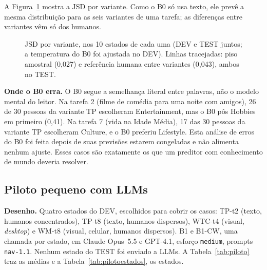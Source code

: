 \documentclass[12pt]{article}
\newcommand{\code}[1]{\texttt{#1}}
\begin{document}
A Figura~\ref{fig:variantes} mostra a JSD por variante. Como o B0 só usa texto, ele prevê a mesma distribuição para as seis variantes de uma tarefa; as diferenças entre variantes vêm só dos humanos.

\begin{figure}[ht]
\centering
{}
\caption{JSD por variante, nos 10 estados de cada uma (DEV e TEST juntos; a temperatura do B0 foi ajustada no DEV). Linhas tracejadas: piso amostral (0,027) e referência humana entre variantes (0,043), ambos no TEST.}
\label{fig:variantes}
\end{figure}

\textbf{Onde o B0 erra.} O B0 segue a semelhança literal entre palavras, não o modelo mental do leitor. Na tarefa 2 (filme de comédia para uma noite com amigos), 26 de 30 pessoas da variante TP escolheram Entertainment, mas o B0 pôs Hobbies em primeiro (0,41). Na tarefa 7 (vida na Idade Média), 17 das 30 pessoas da variante TP escolheram Culture, e o B0 preferiu Lifestyle. Esta análise de erros do B0 foi feita depois de suas previsões estarem congeladas e não alimenta nenhum ajuste. Esses casos são exatamente os que um preditor com conhecimento de mundo deveria resolver.

\subsection{Piloto pequeno com LLMs}
\label{sec:piloto}

\begin{real}
\textbf{Desenho.} Quatro estados do DEV, escolhidos para cobrir os casos: TP-t2 (texto, humanos concentrados), TP-t8 (texto, humanos dispersos), WTC-t4 (visual, \textit{desktop}) e WM-t8 (visual, celular, humanos dispersos). B1 e B1-CW, uma chamada por estado, em Claude Opus~5.5 e GPT-4.1, esforço \code{medium}, prompts \code{nav-1.1}. Nenhum estado do TEST foi enviado a LLMs. A Tabela~\ref{tab:piloto} traz as médias e a Tabela~\ref{tab:pilotoestados}, os estados.
\end{real}
\end{document}
